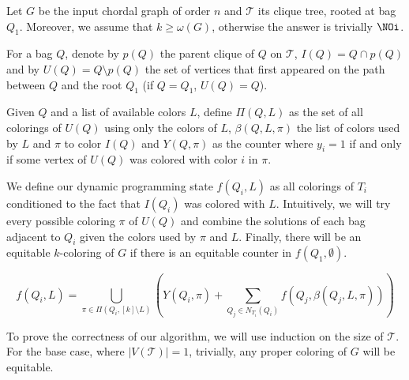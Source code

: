 \begin{tproof}
    Let $G$ be the input chordal graph of order $n$ and $\mathcal{T}$ its clique tree, rooted at bag $Q_1$. Moreover, we assume that $k \geq \omega(G)$, otherwise the answer is trivially $\NOi$.
    
    For a bag $Q$, denote by $p(Q)$ the parent clique of $Q$ on $\mathcal{T}$, $I(Q) = Q \cap p(Q)$ and by $U(Q) = Q \setminus p(Q)$ the set of vertices that first appeared on the path between $Q$ and the root $Q_1$ (if $Q = Q_1$, $U(Q) = Q$).
    
    Given $Q$ and a list of available colors $L$, define $\Pi(Q,L)$ as the set of all colorings of $U(Q)$ using only the colors of $L$, $\beta(Q,L,\pi)$ the list of colors used by $L$ and $\pi$ to color $I(Q)$ and $Y(Q,\pi)$ as the counter where $y_i = 1$ if and only if some vertex of $U(Q)$ was colored with color $i$ in $\pi$.
    
    We define our dynamic programming state $f(Q_i, L)$ as all colorings of $T_i$ conditioned to the fact that $I(Q_i)$ was colored with $L$. Intuitively, we will try every possible coloring $\pi$ of $U(Q)$ and combine the solutions of each bag adjacent to $Q_i$ given the colors used by $\pi$ and $L$. Finally, there will be an equitable $k$-coloring of $G$ if there is an equitable counter in $f(Q_1, \emptyset)$.
    
    \begin{equation*}
        f(Q_i, L) = \bigcup_{\pi \in \Pi(Q_i, [k] \setminus L)} \left(Y(Q_i, \pi) + \sum_{Q_j \in N_{T_i}(Q_i)} f(Q_j, \beta(Q_j, L, \pi))\right)
    \end{equation*}
    
    To prove the correctness of our algorithm, we will use induction on the size of $\mathcal{T}$.
    For the base case, where $|V(\mathcal{T})| = 1$, trivially, any proper coloring of $G$ will be equitable.
    

\end{tproof}
